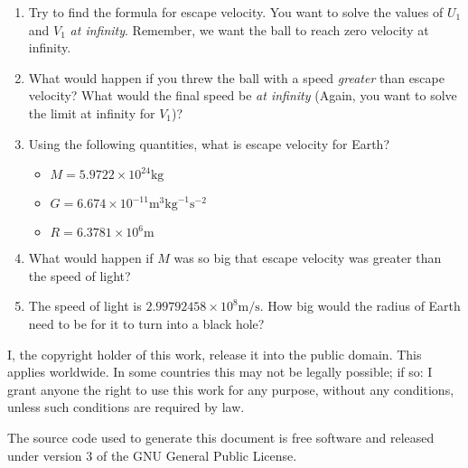 \documentclass{article}
\begin{document}
    \begin{enumerate}
        \item
            Try to find the formula for escape velocity. You want to solve
            the values of $U_{1}$ and $V_{1}$ \textit{at infinity}. Remember,
            we want the ball to reach zero velocity at infinity.
        \item
            What would happen if you threw the ball with a speed
            \textit{greater} than escape velocity? What would the final speed
            be \textit{at infinity} (Again, you want to solve the limit at
            infinity for $V_{1}$)?
        \item
            Using the following quantities, what is escape velocity for Earth?
            \begin{itemize}
                \item
                    $M=5.9722\times10^{24}\text{kg}$
                \item
                    $G=6.674\times10^{-11}\text{m}^{3}\text{kg}^{-1}\text{s}^{-2}$
                \item
                    $R=6.3781\times{10}^{6}\text{m}$
            \end{itemize}
        \item
            What would happen if $M$ was so big that escape velocity was
            greater than the speed of light?
        \item
            The speed of light is
            $2.99792458\times{10}^{8}\text{m}/\text{s}$. How big would
            the radius of Earth need to be for it to turn into a black hole?
    \end{enumerate}
    \newpage
    I, the copyright holder of this work, release it into the public domain.
    This applies worldwide. In some countries this may not be legally possible;
    if so: I grant anyone the right to use this work for any purpose, without
    any conditions, unless such conditions are required by law.
    \par\hfill\par
    The source code used to generate this document is free software and released
    under version 3 of the GNU General Public License.
\end{document}

